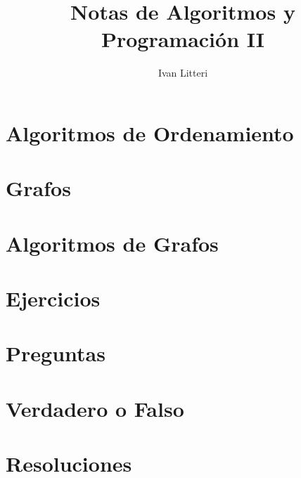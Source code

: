 \documentclass[hidelinks]{article}
\title{Notas de Algoritmos y Programación II}
\author{Ivan Litteri}
\date{}
\begin{document}
\maketitle
\lstset{language=C}
\lstset{language=Python}
\tableofcontents
\clearpage

\section{Algoritmos de Ordenamiento}


\clearpage

\section{Grafos}

\clearpage

\section{Algoritmos de Grafos}

\clearpage

\section{Ejercicios}

\clearpage

\section{Preguntas}

\clearpage

\section{Verdadero o Falso}

\clearpage

\section{Resoluciones}

\clearpage

\printindex
\end{document}
